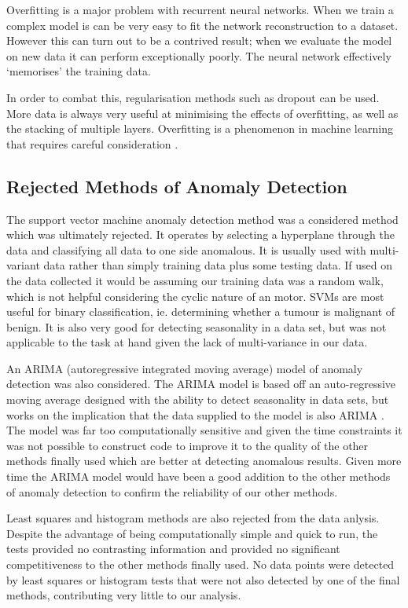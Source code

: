 Overfitting is a major problem with recurrent neural networks. When we train a complex model is can be very easy to fit the network reconstruction to a dataset. However this can turn out to be a contrived result; when we evaluate the model on new data it can perform exceptionally poorly. The neural network effectively `memorises' the training data.

In order to combat this, regularisation methods such as dropout can be used. More data is always very useful at minimising the effects of overfitting, as well as the stacking of multiple layers. Overfitting is a phenomenon in machine learning that requires careful consideration \cite{DBLP:journals/corr/LiptonKEW15}.

\subsection{Rejected Methods of Anomaly Detection}
The support vector machine anomaly detection method was a considered method which was ultimately rejected. It operates by selecting a hyperplane through the data and classifying all data to one side anomalous. It is usually used with multi-variant data rather than simply training data plus some testing data. If used on the data collected it would be assuming our training data was a random walk, which is not helpful considering the cyclic nature of an motor. SVMs are most useful for binary classification, ie. determining whether a tumour is malignant of benign. It is also very good for detecting seasonality in a data set, but was not applicable to the task at hand given the lack of multi-variance in our data.

An ARIMA (autoregressive integrated moving average) model of anomaly detection was also considered. The ARIMA model is based off an auto-regressive moving average designed with the ability to detect seasonality in data sets, but works on the implication that the data supplied to the model is also ARIMA \cite{wei1994time}. The model was far too computationally sensitive and given the time constraints it was not possible to construct code to improve it to the quality of the other methods finally used which are better at detecting anomalous results. Given more time the ARIMA model would have been a good addition to the other methods of anomaly detection to confirm the reliability of our other methods.

Least squares and histogram methods are also rejected from the data anlysis. Despite the advantage of being computationally simple and quick to run, the tests provided no contrasting information and provided no significant competitiveness to the other methods finally used. No data points were detected by least squares or histogram tests that were not also detected by one of the final methods, contributing very little to our analysis.